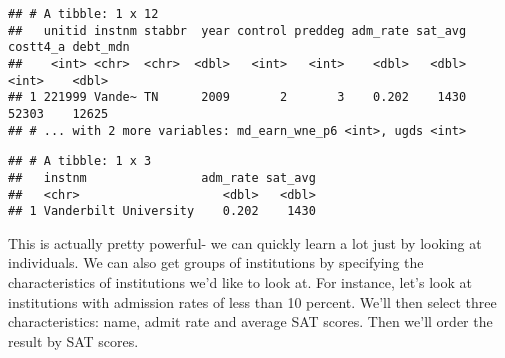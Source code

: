 \documentclass[
]{article}
\newenvironment{Shaded}{\begin{snugshade}}{\end{snugshade}}
\newcommand{\CommentTok}[1]{\textcolor[rgb]{0.56,0.35,0.01}{\textit{#1}}}
\newcommand{\DecValTok}[1]{\textcolor[rgb]{0.00,0.00,0.81}{#1}}
\newcommand{\KeywordTok}[1]{\textcolor[rgb]{0.13,0.29,0.53}{\textbf{#1}}}
\newcommand{\NormalTok}[1]{#1}
\newcommand{\OperatorTok}[1]{\textcolor[rgb]{0.81,0.36,0.00}{\textbf{#1}}}
\newcommand{\StringTok}[1]{\textcolor[rgb]{0.31,0.60,0.02}{#1}}
\begin{document}
\begin{Shaded}
\end{Shaded}

\begin{verbatim}
## # A tibble: 1 x 12
##   unitid instnm stabbr  year control preddeg adm_rate sat_avg costt4_a debt_mdn
##    <int> <chr>  <chr>  <dbl>   <int>   <int>    <dbl>   <dbl>    <int>    <dbl>
## 1 221999 Vande~ TN      2009       2       3    0.202    1430    52303    12625
## # ... with 2 more variables: md_earn_wne_p6 <int>, ugds <int>
\end{verbatim}

\begin{Shaded}
\end{Shaded}

\begin{verbatim}
## # A tibble: 1 x 3
##   instnm                adm_rate sat_avg
##   <chr>                    <dbl>   <dbl>
## 1 Vanderbilt University    0.202    1430
\end{verbatim}

This is actually pretty powerful- we can quickly learn a lot just by
looking at individuals. We can also get groups of institutions by
specifying the characteristics of institutions we'd like to look at. For
instance, let's look at institutions with admission rates of less than
10 percent. We'll then select three characteristics: name, admit rate
and average SAT scores. Then we'll order the result by SAT scores.

\begin{Shaded}
\end{Shaded}
\end{document}
